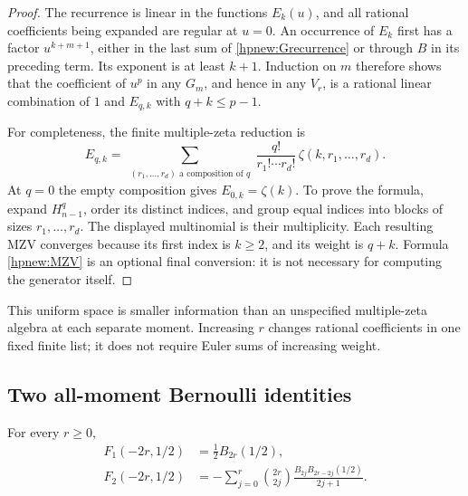 \begin{proof}
The recurrence is linear in the functions $E_k(u)$, and all rational
coefficients being expanded are regular at $u=0$.
An occurrence of $E_k$ first has a factor $u^{k+m+1}$, either in
the last sum of \eqref{hpnew:Grecurrence} or through $B$ in its
preceding term. Its exponent is at least $k+1$.
Induction on $m$ therefore shows that the coefficient of $u^p$ in
any $G_m$, and hence in any $V_r$, is a rational linear combination
of $1$ and $E_{q,k}$ with $q+k\le p-1$.

For completeness, the finite multiple-zeta reduction is
\begin{equation}\label{hpnew:MZV}
 E_{q,k}=\sum_{\substack{(r_1,\ldots,r_d)\text{ a composition of }q}}
       \frac{q!}{r_1!\cdots r_d!}\,
                          \zeta(k,r_1,\ldots,r_d).
\end{equation}
At $q=0$ the empty composition gives $E_{0,k}=\zeta(k)$.
To prove the formula, expand $H_{n-1}^q$, order its distinct indices,
and group equal indices into blocks of sizes $r_1,\ldots,r_d$.
The displayed multinomial is their multiplicity. Each resulting MZV
converges because its first index is $k\ge2$, and its weight is
$q+k$. Formula \eqref{hpnew:MZV} is an optional final conversion:
it is not necessary for computing the generator itself.
\end{proof}

This uniform space is smaller information than an unspecified
multiple-zeta algebra at each separate moment. Increasing $r$ changes
rational coefficients in one fixed finite list; it does not require
Euler sums of increasing weight.

\subsection{Two all-moment Bernoulli identities}

\begin{corollary}
\label{hpnew:Bernoulli}
For every $r\ge0$,
\begin{align}
 F_1(-2r,1/2)&=\frac12 B_{2r}(1/2),\label{hpnew:firstpower}\\
 F_2(-2r,1/2)&=-\sum_{j=0}^{r}\binom{2r}{2j}
       \frac{B_{2j}B_{2r-2j}(1/2)}{2j+1}.
                         \label{hpnew:secondpower}
\end{align}
\end{corollary}


